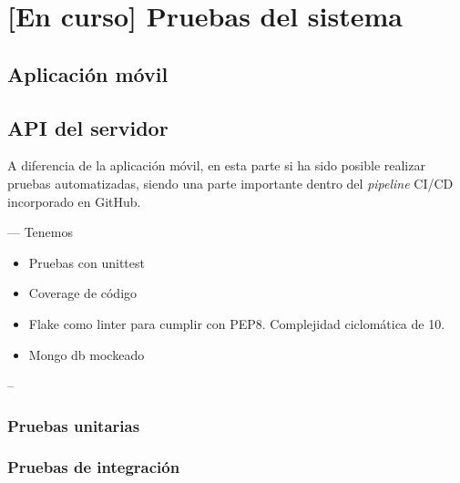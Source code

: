 \chapter{[En curso] Pruebas del sistema}
\label{chapter:pruebas}
    \section{Aplicación móvil}
    \section{API del servidor}

A diferencia de la aplicación móvil, en esta parte si ha sido posible realizar pruebas automatizadas, siendo una parte importante dentro del \textit{pipeline} CI/CD incorporado en GitHub. 

---
Tenemos
\begin{itemize}
    \item Pruebas con unittest
    \item Coverage de código
    \item Flake como linter para cumplir con PEP8. Complejidad ciclomática de 10.
    \item Mongo db mockeado
\end{itemize}
--
    
        \subsection{Pruebas unitarias}
        \subsection{Pruebas de integración}
